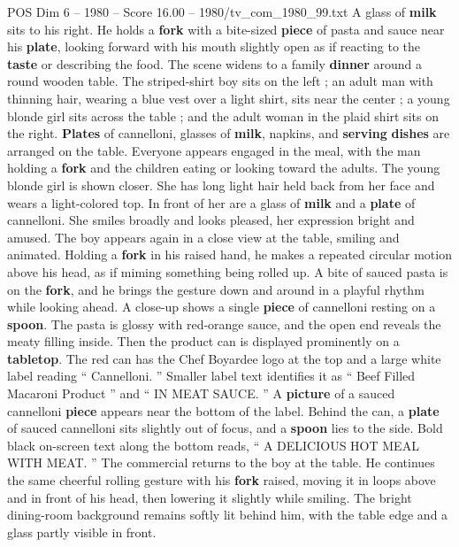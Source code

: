 \begin{textsample}{POS Dim 6 – 1980 – Score 16.00 – 1980/tv\_com\_1980\_99.txt}
A glass of \textbf{milk} sits to his right.
He holds a \textbf{fork} with a bite-sized \textbf{piece} of pasta and sauce near his \textbf{plate}, looking forward with his mouth slightly open as if reacting to the \textbf{taste} or describing the food.
The scene widens to a family \textbf{dinner} around a round wooden table.
The striped-shirt boy sits on the left ; an adult man with thinning hair, wearing a blue vest over a light shirt, sits near the center ; a young blonde girl sits across the table ; and the adult woman in the plaid shirt sits on the right. \textbf{Plates} of cannelloni, glasses of \textbf{milk}, napkins, and \textbf{serving} \textbf{dishes} are arranged on the table.
Everyone appears engaged in the meal, with the man holding a \textbf{fork} and the children eating or looking toward the adults.
The young blonde girl is shown closer.
She has long light hair held back from her face and wears a light-colored top.
In front of her are a glass of \textbf{milk} and a \textbf{plate} of cannelloni.
She smiles broadly and looks pleased, her expression bright and amused.
The boy appears again in a close view at the table, smiling and animated.
Holding a \textbf{fork} in his raised hand, he makes a repeated circular motion above his head, as if miming something being rolled up.
A bite of sauced pasta is on the \textbf{fork}, and he brings the gesture down and around in a playful rhythm while looking ahead.
A close-up shows a single \textbf{piece} of cannelloni resting on a \textbf{spoon}.
The pasta is glossy with red-orange sauce, and the open end reveals the meaty filling inside.
Then the product can is displayed prominently on a \textbf{tabletop}.
The red can has the Chef Boyardee logo at the top and a large white label reading “ Cannelloni. ” Smaller label text identifies it as “ Beef Filled Macaroni Product ” and “ IN MEAT SAUCE. ” A \textbf{picture} of a sauced cannelloni \textbf{piece} appears near the bottom of the label.
Behind the can, a \textbf{plate} of sauced cannelloni sits slightly out of focus, and a \textbf{spoon} lies to the side.
Bold black on-screen text along the bottom reads, “ A DELICIOUS HOT MEAL WITH MEAT. ” The commercial returns to the boy at the table.
He continues the same cheerful rolling gesture with his \textbf{fork} raised, moving it in loops above and in front of his head, then lowering it slightly while smiling.
The bright dining-room background remains softly lit behind him, with the table edge and a glass partly visible in front.

\end{textsample}
